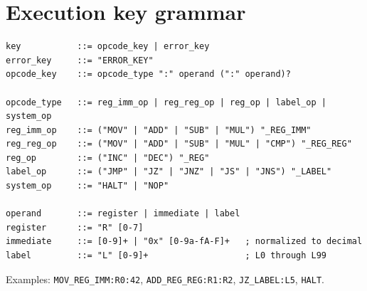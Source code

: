 \documentclass[11pt]{article}
\begin{document}
\section{Execution key grammar}
\begin{lstlisting}[caption={BNF grammar for KVRM-CPU execution keys.}]
key           ::= opcode_key | error_key
error_key     ::= "ERROR_KEY"
opcode_key    ::= opcode_type ":" operand (":" operand)?

opcode_type   ::= reg_imm_op | reg_reg_op | reg_op | label_op | system_op
reg_imm_op    ::= ("MOV" | "ADD" | "SUB" | "MUL") "_REG_IMM"
reg_reg_op    ::= ("MOV" | "ADD" | "SUB" | "MUL" | "CMP") "_REG_REG"
reg_op        ::= ("INC" | "DEC") "_REG"
label_op      ::= ("JMP" | "JZ" | "JNZ" | "JS" | "JNS") "_LABEL"
system_op     ::= "HALT" | "NOP"

operand       ::= register | immediate | label
register      ::= "R" [0-7]
immediate     ::= [0-9]+ | "0x" [0-9a-fA-F]+   ; normalized to decimal
label         ::= "L" [0-9]+                   ; L0 through L99
\end{lstlisting}

\noindent Examples: \texttt{MOV\_REG\_IMM:R0:42}, \texttt{ADD\_REG\_REG:R1:R2}, \texttt{JZ\_LABEL:L5}, \texttt{HALT}.



\end{document}
